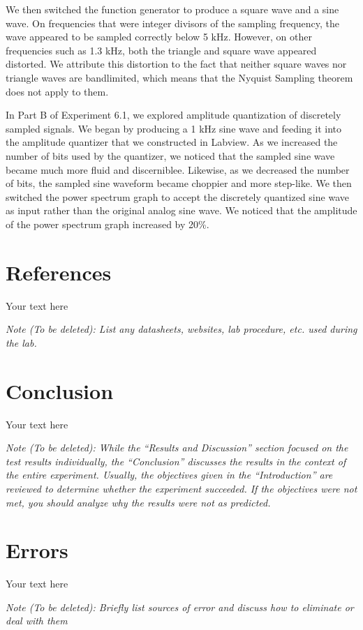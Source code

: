 \documentclass[10pt]{article}
\begin{document}
We then switched the function generator to produce a square wave and a sine wave. On frequencies that were integer divisors of the sampling frequency, the wave appeared to be sampled correctly below 5 kHz. However, on other frequencies such as 1.3 kHz, both the triangle and square wave appeared distorted. We attribute this distortion to the fact that neither square waves nor triangle waves are bandlimited, which means that the Nyquist Sampling theorem does not apply to them.


In Part B of Experiment 6.1, we explored amplitude quantization of discretely sampled signals. We began by producing a 1 kHz sine wave and feeding it into the amplitude quantizer that we constructed in Labview. As we increased the number of bits used by the quantizer, we noticed that the sampled sine wave became much more fluid and discerniblee. Likewise, as we decreased the number of bits, the sampled sine waveform became choppier and more step-like. We then switched the power spectrum graph to accept the discretely quantized sine wave as input rather than the original analog sine wave. We noticed that the amplitude of the power spectrum graph increased by 20\%. 

\section{References}

Your text here

\medskip

\textit{Note (To be deleted): List any datasheets, websites, lab procedure, etc. used during the lab.}

\section{Conclusion}

Your text here

\medskip

\textit{Note (To be deleted): While the ``Results and Discussion'' section focused on the test results individually, the ``Conclusion'' discusses the results in the context of the entire experiment. Usually, the objectives given in the ``Introduction'' are reviewed to determine whether the experiment succeeded. If the objectives were not met, you should analyze why the results were not as predicted.}

\section{Errors}

Your text here

\medskip

\textit{Note (To be deleted): Briefly list sources of error and discuss how to eliminate or deal with them}
\end{document}
